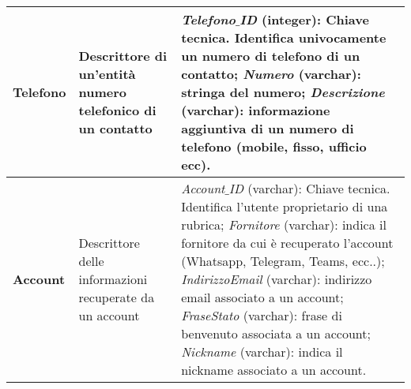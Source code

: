 \begin{longtable}{p{}p{}p{}}
\\ \midrule
\textbf{Telefono} &
Descrittore di un'entità numero telefonico di un contatto &
\textit{Telefono$\_$ID} (integer): Chiave tecnica. Identifica univocamente un numero di telefono di un contatto; \newline
\textit{Numero} (varchar): stringa del numero;\newline
\textit{Descrizione} (varchar): informazione aggiuntiva di un numero di telefono (mobile, fisso, ufficio ecc).
\\ \midrule
\textbf{Account} &
Descrittore delle informazioni recuperate da un account &
\textit{Account$\_$ID} (varchar): Chiave tecnica. Identifica l’utente proprietario di una rubrica;\newline
\textit{Fornitore} (varchar): indica il fornitore da cui è recuperato l'account (Whatsapp, Telegram, Teams, ecc..);\newline
\textit{IndirizzoEmail} (varchar): indirizzo email associato a un account;\newline
\textit{FraseStato} (varchar): frase di benvenuto associata a un account;\newline
\textit{Nickname} (varchar): indica il nickname associato a un account.
\\ \bottomrule
\end{longtable}
\clearpage

